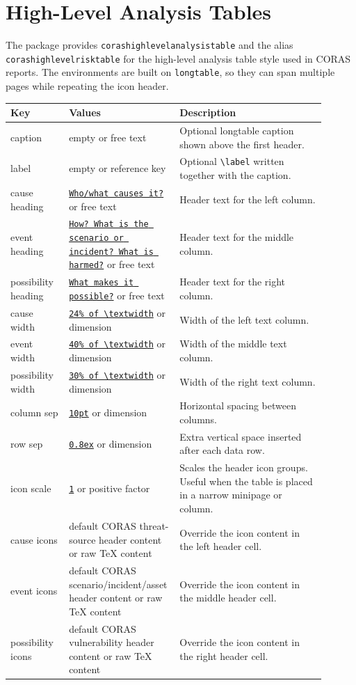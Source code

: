 \documentclass[a4paper]{article}
\newcommand{\keydefault}[1]{\underline{\texttt{#1}}}
\begin{document}
\section{High-Level Analysis Tables}

The package provides \texttt{corashighlevelanalysistable} and the alias
\texttt{corashighlevelrisktable} for the high-level analysis table style used
in CORAS reports. The environments are built on \texttt{longtable}, so they
can span multiple pages while repeating the icon header.

\begin{center}
\begin{tabular}{>{\ttfamily}p{0.18\linewidth}p{0.27\linewidth}p{0.45\linewidth}}
\hline
Key & Values & Description \\
\hline
caption & empty or free text & Optional longtable caption shown above the first header. \\
label & empty or reference key & Optional \texttt{\textbackslash label} written together with the caption. \\
cause heading & \keydefault{Who/what causes it?} or free text & Header text for the left column. \\
event heading & \keydefault{How? What is the scenario or incident? What is harmed?} or free text & Header text for the middle column. \\
possibility heading & \keydefault{What makes it possible?} or free text & Header text for the right column. \\
cause width & \keydefault{24\% of \textbackslash textwidth} or dimension & Width of the left text column. \\
event width & \keydefault{40\% of \textbackslash textwidth} or dimension & Width of the middle text column. \\
possibility width & \keydefault{30\% of \textbackslash textwidth} or dimension & Width of the right text column. \\
column sep & \keydefault{10pt} or dimension & Horizontal spacing between columns. \\
row sep & \keydefault{0.8ex} or dimension & Extra vertical space inserted after each data row. \\
icon scale & \keydefault{1} or positive factor & Scales the header icon groups. Useful when the table is placed in a narrow minipage or column. \\
cause icons & default CORAS threat-source header content or raw TeX content & Override the icon content in the left header cell. \\
event icons & default CORAS scenario/incident/asset header content or raw TeX content & Override the icon content in the middle header cell. \\
possibility icons & default CORAS vulnerability header content or raw TeX content & Override the icon content in the right header cell. \\
\hline
\end{tabular}
\end{center}
\end{document}
